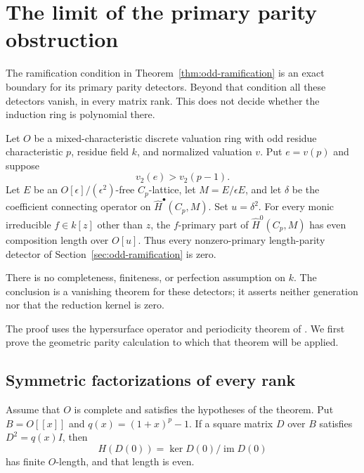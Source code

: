 \section{The limit of the primary parity obstruction}
\label{sec:complementary-detector-limit}

The ramification condition in Theorem~\ref{thm:odd-ramification}
is an exact boundary for its primary parity detectors.  Beyond that
condition all these detectors vanish, in every matrix rank.  This
does not decide whether the induction ring is polynomial there.

\begin{theorem}\label{thm:complementary-detector-limit}
Let $O$ be a mixed-characteristic discrete valuation ring with odd
residue characteristic $p$, residue field $k$, and normalized valuation
$v$.  Put $e=v(p)$ and suppose
\[
 v_2(e)>v_2(p-1).
\]
Let $E$ be an $O[\epsilon]/(\epsilon^2)$-free $C_p$-lattice,
let $M=E/\epsilon E$, and let $\delta$ be the coefficient connecting
operator on $\widehat H^\bullet(C_p,M)$.  Set $u=\delta^2$.
For every monic irreducible $f\in k[z]$ other than $z$, the
$f$-primary part of $\widehat H^0(C_p,M)$ has even composition
length over $O[u]$.  Thus every nonzero-primary length-parity
detector of Section~\ref{sec:odd-ramification} is zero.

There is no completeness, finiteness, or perfection assumption on
$k$.  The conclusion is a vanishing theorem for these detectors;
it asserts neither generation nor that the reduction kernel is zero.
\end{theorem}

The proof uses the hypersurface operator and periodicity theorem of
\citet[Proposition~1.3, Corollary~1.4, pp.~40--41;
Theorem~6.1(iii), pp.~52--53]{Eisenbud1980}.  We first prove the
geometric parity calculation to which that theorem will be applied.

\subsection{Symmetric factorizations of every rank}

\begin{lemma}\label{lem:symmetric-factorization-parity}
Assume that $O$ is complete and satisfies the hypotheses of the
theorem.  Put $B=O[[x]]$ and $q(x)=(1+x)^p-1$.
If a square matrix $D$ over $B$ satisfies $D^2=q(x)I$, then
\[
 H(D(0))=\ker D(0)/\operatorname{im}D(0)
\]
has finite $O$-length, and that length is even.
\end{lemma}

